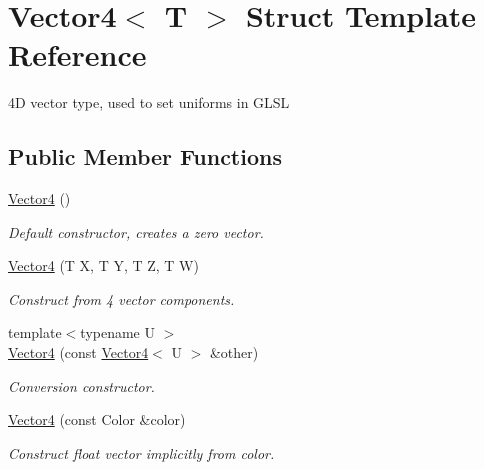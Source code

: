 \hypertarget{struct_vector4}{}\section{Vector4$<$ T $>$ Struct Template Reference}
\label{struct_vector4}


4D vector type, used to set uniforms in G\+L\+SL  


\subsection*{Public Member Functions}
\begin{DoxyCompactItemize}
\item 
\mbox{\hyperlink{struct_vector4_afdef97d94e5697622b5322637028accf}{Vector4}} ()
\begin{DoxyCompactList}\small\item\em Default constructor, creates a zero vector. \end{DoxyCompactList}\item 
\mbox{\hyperlink{struct_vector4_ae099ed0a6d7d78ed38ac023d0e4cec25}{Vector4}} (T X, T Y, T Z, T W)
\begin{DoxyCompactList}\small\item\em Construct from 4 vector components. \end{DoxyCompactList}\item 
{\footnotesize template$<$typename U $>$ }\\\mbox{\hyperlink{struct_vector4_a6413d8b504d7fdfbb600a0caf9c90cc2}{Vector4}} (const \mbox{\hyperlink{struct_vector4}{Vector4}}$<$ U $>$ \&other)
\begin{DoxyCompactList}\small\item\em Conversion constructor. \end{DoxyCompactList}\item 
\mbox{\hyperlink{struct_vector4_af1da65a743ddbb5c779b41eae766c00d}{Vector4}} (const Color \&color)
\begin{DoxyCompactList}\small\item\em Construct float vector implicitly from color. \end{DoxyCompactList}\end{DoxyCompactItemize}
